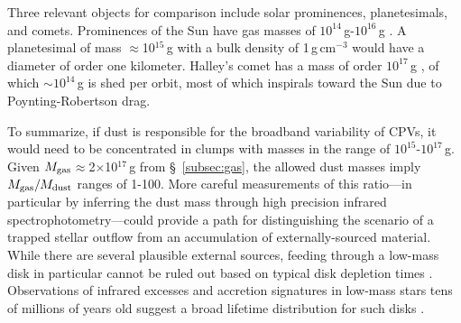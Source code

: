 \documentclass{nature3}
\begin{document}
\begin{methods}
Three relevant objects for comparison include solar prominences,
planetesimals, and comets.  Prominences of the Sun have gas masses of
$10^{14}$\,g-$10^{16}$\,g \cite{VialEngvold2015}.  A planetesimal of
mass $\approx$10$^{15}$\,g with a bulk density of 1\,g\,cm$^{-3}$
would have a diameter of order one kilometer.  Halley's comet has a
mass of order $10^{17}$\,g \cite{Rickman1989}, of which
$\sim$$10^{14}$\,g is shed per orbit, most of which inspirals toward
the Sun due to Poynting-Robertson drag.

To summarize, if dust is responsible for the broadband variability of
CPVs, it would need to be concentrated in clumps with masses in the
range of $10^{15}$-$10^{17}$\,g.  Given $M_{\rm
gas}$$\approx$2$\times$10$^{17}$\,g from \S~\ref{subsec:gas}, the
allowed dust masses imply $M_{\rm gas}/M_{\rm dust}$ ranges of 1-100.
More careful measurements of this ratio---in particular by inferring
the dust mass through high precision infrared
spectrophotometry---could provide a path for distinguishing the
scenario of a trapped stellar outflow from an accumulation of
externally-sourced material.  While there are several plausible
external sources, feeding through a low-mass disk in particular cannot
be ruled out based on typical disk depletion times \cite{Haisch2001}.
Observations of infrared excesses and accretion signatures in low-mass
stars tens of millions of years old suggest a broad lifetime
distribution for such disks
\cite{Silverberg2020,Lee2020,Gaidos2022,Pfalzner2024}.




\end{methods}
\end{document}
